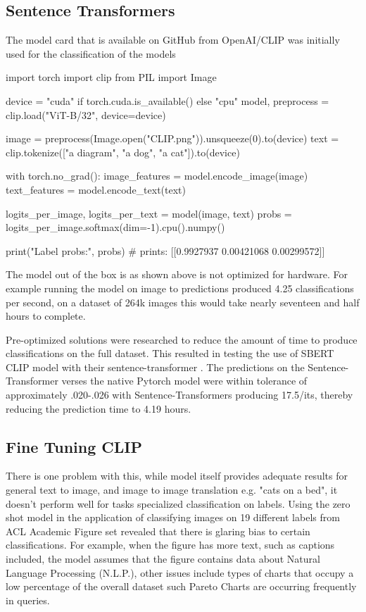 \documentclass[article, 10pt]{article}
\begin{document}
\subsection{Sentence Transformers}
The model card that is available on GitHub from OpenAI/CLIP was initially used for the classification of the models
\begin{python}
import torch
import clip
from PIL import Image

device = "cuda" if torch.cuda.is_available() else "cpu"
model, preprocess = clip.load("ViT-B/32", device=device)

image = preprocess(Image.open("CLIP.png")).unsqueeze(0).to(device)
text = clip.tokenize(["a diagram", "a dog", "a cat"]).to(device)

with torch.no_grad():
    image_features = model.encode_image(image)
    text_features = model.encode_text(text)
    
    logits_per_image, logits_per_text = model(image, text)
    probs = logits_per_image.softmax(dim=-1).cpu().numpy()

print("Label probs:", probs)  # prints: [[0.9927937  0.00421068 0.00299572]]
\end{python} \cite{OpenAI}
The model out of the box is as shown above is not optimized for hardware. For example running the model on image to predictions produced 4.25 classifications per second, on a dataset of 264k images this would take nearly seventeen and half hours to complete. 

Pre-optimized solutions were researched to reduce the amount of time to produce classifications on the full dataset. This resulted in testing the use of SBERT CLIP model with their sentence-transformer \cite{SBERT}.
The predictions on the Sentence-Transformer verses the native Pytorch model were within
tolerance of approximately .020-.026 with Sentence-Transformers producing 17.5/its, thereby reducing the prediction time to 4.19 hours.

\subsection{Fine Tuning CLIP}
There is one problem with this, while model itself provides adequate results for general text to image, and image to image translation e.g. "cats on a bed", it doesn't perform well for tasks specialized classification on labels.
Using the zero shot model in the application of classifying images on 19 different labels from ACL Academic Figure set revealed that there is glaring bias to certain classifications. For example, when the figure has more text, such as captions included, the model assumes that the figure contains data about Natural Language Processing (N.L.P.), 
other issues include types of charts that occupy a low percentage of the overall dataset such Pareto Charts are occurring
frequently in queries. 
\end{document}
